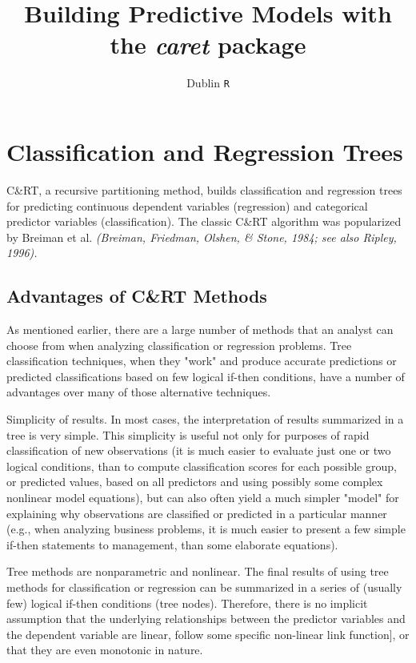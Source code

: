 \documentclass[11pt]{article} %
\title{Building Predictive Models with the \textit{caret} package}
\author{Dublin \texttt{R}}
\begin{document}
\maketitle
\tableofcontents
\newpage


\section{Classification and Regression Trees}
C\&RT, a recursive partitioning method, builds classification and regression trees for predicting continuous dependent variables (regression) and categorical predictor variables (classification). The classic C\&RT algorithm was popularized by Breiman et al. \textit{(Breiman, Friedman, Olshen, \& Stone, 1984; see also Ripley, 1996).}

\subsection{Advantages of C\&RT Methods}


As mentioned earlier, there are a large number of methods that an analyst can choose from when analyzing classification or regression problems. Tree classification techniques, when they "work" and produce accurate predictions or predicted classifications based on few logical if-then conditions, have a number of advantages over many of those alternative techniques.

Simplicity of results. In most cases, the interpretation of results summarized in a tree is very simple. This simplicity is useful not only for purposes of rapid classification of new observations (it is much easier to evaluate just one or two logical conditions, than to compute classification scores for each possible group, or predicted values, based on all predictors and using possibly some complex nonlinear model equations), but can also often yield a much simpler "model" for explaining why observations are classified or predicted in a particular manner (e.g., when analyzing business problems, it is much easier to present a few simple if-then statements to management, than some elaborate equations).

Tree methods are nonparametric and nonlinear. The final results of using tree methods for classification or regression can be summarized in a series of (usually few) logical if-then conditions (tree nodes). Therefore, there is no implicit assumption that the underlying relationships between the predictor variables and the dependent variable are linear, follow some specific non-linear link function], or that they are even monotonic in nature. 
\end{document}
